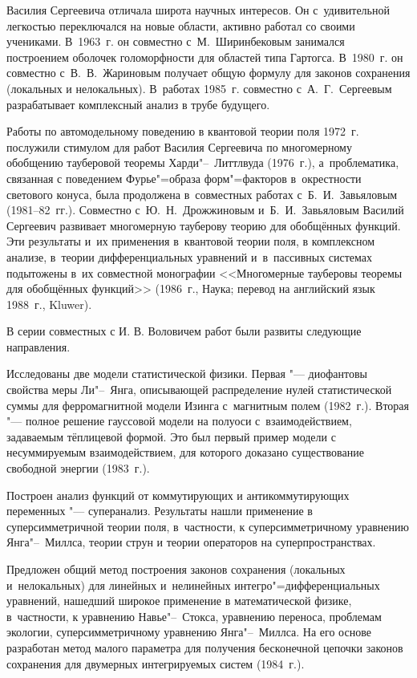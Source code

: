 Василия Сергеевича отличала широта научных интересов. Он с~удивительной легкостью переключался на новые области, активно работал со своими учениками. 
В~1963~г. он совместно с~М.~Ширинбековым занимался построением оболочек голоморфности для областей типа Гартогса. В~1980~г. он совместно с~В.~В.~Жариновым получает общую формулу для законов сохранения (локальных и не\-локальных). 
В~работах 1985~г. совместно с~А.~Г.~Сергеевым разрабатывает комплексный анализ в трубе
будущего.


Работы по автомодельному поведению в квантовой теории поля 1972~г. послужили стимулом для работ Василия Сергеевича по многомерному обобщению тауберовой теоремы Харди"--~Литтлвуда (1976~г.), а~проблематика, связанная с поведением Фурье"=образа форм"=факторов в~окрестности светового конуса, была продолжена в~совместных работах с~Б.~И.~Завьяловым (1981--82~гг.). 
Совместно с~Ю.~Н.~Дрожжиновым и~Б.~И.~Завьяловым Василий Сергеевич развивает многомерную тауберову
теорию для обобщённых функций. 
Эти результаты и~их применения в~квантовой теории поля, в комплексном анализе, в~теории дифференциальных уравнений и~в~пассивных системах подытожены в~их совместной монографии <<Многомерные тауберовы теоремы для обобщённых функций>> (1986~г., Наука; перевод на английский язык 1988~г., Kluwer).


В серии совместных с И. В. Воловичем работ были развиты следующие направления.

Исследованы две модели статистической физики. Первая "--- диофантовы свойства меры Ли"--~Янга, описывающей распределение нулей статистической суммы для ферромагнитной модели Изинга с~магнитным
полем (1982~г.). 
Вторая "--- полное решение гауссовой модели на полуоси с~взаимодействием, задаваемым тёплицевой формой. 
Это был первый пример модели с несуммируемым взаимодействием, для которого доказано существование свободной энергии (1983~г.).


Построен анализ функций от коммутирующих и антикоммутирующих переменных "--- суперанализ. Результаты нашли применение в суперсимметричной теории поля, в~частности, к суперсимметричному уравнению Янга"--~Миллса, теории струн и теории операторов на суперпространствах.


Предложен общий метод построения законов сохранения (локальных и~не\-локальных) для линейных и~нелинейных интегро"=дифференциальных уравнений, нашедший широкое применение в математической физике, в~частности, к уравнению Навье"--~Стокса, уравнению переноса, проблемам экологии, суперсимметричному уравнению Янга"--~Миллса. На его основе
разработан метод малого параметра для получения бесконечной цепочки
законов сохранения для двумерных интегрируемых систем (1984~г.).



